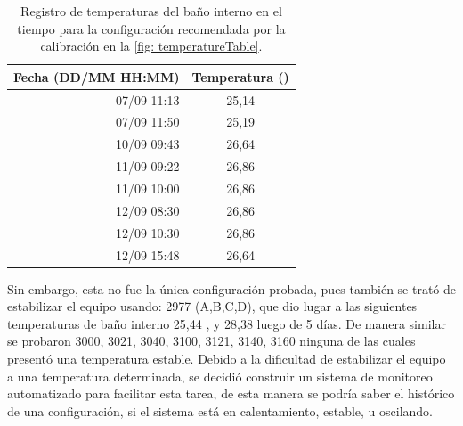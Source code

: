 	\begin{table}[h]
		\centering
		\caption{Registro de temperaturas del baño interno en el tiempo para la configuración recomendada por la calibración en la \autoref{fig: temperatureTable}.}
		\begin{tabular}{r|c}
			\hline
			\textbf{Fecha (DD/MM HH:MM)} & \textbf{Temperatura (\grad{})} \\
			\hline
			07/09 11:13 & 25,14 \\
			07/09 11:50 & 25,19 \\
			10/09 09:43 & 26,64 \\
			11/09 09:22 & 26,86 \\
			11/09 10:00 & 26,86 \\
			12/09 08:30 & 26,86 \\
			12/09 10:30 & 26,86 \\
			12/09 15:48 & 26,64 \\
			\hline
		\end{tabular}
		\label{tb: temperatureRegister}
	\end{table}
	
	Sin embargo, esta no fue la única configuración probada, pues también se trató de estabilizar el equipo usando: 2977 (A,B,C,D), que dio lugar a las siguientes temperaturas de baño interno 25,44 \grad{}, y 28,38 \grad{} luego de 5 días. De manera similar se probaron 3000, 3021, 3040, 3100, 3121, 3140, 3160 ninguna de las cuales presentó una temperatura estable. Debido a la dificultad de estabilizar el equipo a una temperatura determinada, se decidió construir un sistema de monitoreo automatizado para facilitar esta tarea, de esta manera se podría saber el histórico de una configuración, si el sistema está en calentamiento, estable, u oscilando.
	
